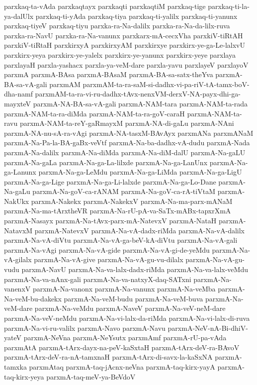 {parxkaq-ta-vAda
parxkaqtayx
parxkaqti
parxkaqtiM
parxkaq-tige
parxkaq-ti-la-ya-dalUlx
parxkaq-ti-yAda
parxkaq-tiya
parxkaq-ti-yalilx
parxkaq-ti-yanunx
parxkaq-tiyeV
parxkaq-tiyu
parxka-ra-Na-dalilx
parxka-ra-Na-da-lilx-ruva
parxka-ra-NavU
parxka-ra-Na-vanunx
parxkarx-mA-cecxVha
parxkiV-tiRtAH
parxkiV-tiRtaH
parxkirxyA
parxkirxyAM
parxkirxye
parxkirx-ye-ga-Le-lalxvU
parxkirx-yeya
parxkirx-ye-yalelx
parxkirx-ye-yanunx
parxkirx-yeye
parxlaya
parxlayaH
parxla-yashacx
parxla-ya-veM-dare
parxla-yavu
parxlayeV
parxlayoV
parxmA
parxmA-BAsa
parxmA-BAsaM
parxmA-BA-sa-satx-theYva
parxmA-BA-sa-vA-gali
parxmAM
parxmAM-ta-ra-saM-si-dadhx-vi-pa-riV-tA-tamx-boV-dha-namf
parxmAM-ta-ra-vi-ru-dadhx-tAvx-nenxVM-derxV-NA-payx-dhi-ga-mayxteV
parxmA-NA-BA-sa-vA-gali
parxmA-NAM-tara
parxmA-NAM-ta-rada
parxmA-NAM-ta-ra-diMda
parxmA-NAM-ta-ra-goV-caraH
parxmA-NAM-ta-ravu
parxmA-NAM-ta-reY-gaRmayxM
parxmA-NA-di-gaLu
parxmA-NAni
parxmA-NA-nu-sA-ra-vAgi
parxmA-NA-tasxM-BAvAyx
parxmANa
parxmANaM
parxmA-Na-Pa-la-BA-gaBx-veVtf
parxmA-Na-ba-dadhx-vA-dudu
parxmA-Nada
parxmA-Na-dalilx
parxmA-Na-diMda
parxmA-Na-diM-dalU
parxmA-Na-gaLU
parxmA-Na-gaLa
parxmA-Na-ga-La-lilxde
parxmA-Na-ga-LanUnx
parxmA-Na-ga-Lanunx
parxmA-Na-ga-LeMdu
parxmA-Na-ga-LiMda
parxmA-Na-ga-LigU
parxmA-Na-ga-Lige
parxmA-Na-ga-Li-lalxde
parxmA-Na-ga-Lo-Dane
parxmA-Na-gaLu
parxmA-Na-goV-ca-rANAM
parxmA-Na-goV-ca-rA-tiVtaM
parxmA-NakUkx
parxmA-Nakekx
parxmA-NakekxV
parxmA-Na-ma-parx-mANaM
parxmA-Na-ma-tArxtheVR
parxmA-Na-rU-pA-va-SaTx-mABx-tapxrXmA
parxmA-Nasayx
parxmA-Na-tAvx-parx-mA-NatevxV
parxmA-NataH
parxmA-NatavxM
parxmA-NatevxV
parxmA-Na-vA-dadx-riMda
parxmA-Na-vA-dalilx
parxmA-Na-vA-diVtu
parxmA-Na-vA-ga-beV-kA-diVtu
parxmA-Na-vA-gali
parxmA-Na-vAgi
parxmA-Na-vA-gide
parxmA-Na-vA-gi-de-yeMdu
parxmA-Na-vA-gilalx
parxmA-Na-vA-give
parxmA-Na-vA-gu-vu-dilalx
parxmA-Na-vA-gu-vudu
parxmA-NavU
parxmA-Na-va-lalx-dadx-riMda
parxmA-Na-va-lalx-veMdu
parxmA-Na-va-nAnx-gali
parxmA-Na-va-natxyX-daq-SATxni
parxmA-Na-vanenxV
parxmA-Na-vanonx
parxmA-Na-vanunx
parxmA-Na-veMba
parxmA-Na-veM-bu-dakekx
parxmA-Na-veM-budu
parxmA-Na-veM-buva
parxmA-Na-veM-dare
parxmA-Na-veMdu
parxmA-NaveV
parxmA-Na-veV-neM-dare
parxmA-Na-veV-neMdu
parxmA-Na-vi-lalx-da-riMda
parxmA-Na-vi-lalx-di-ruva
parxmA-Na-vi-ru-valilx
parxmA-Navo
parxmA-Navu
parxmA-NeV-nA-Bi-dhiV-yateV
parxmA-NeVna
parxmA-NeYsutx
parxmAmf
parxmA-rU-pa-vAda
parxmAtA
parxmA-tArx-dayx-na-peV-kaSxtaH
parxmA-tArx-deV-ra-BAvoV
parxmA-tArx-deV-ra-nA-tamxnaH
parxmA-tArx-di-savx-la-kaSxNA
parxmA-tamxka
parxmAtaq
parxmA-taq-jAcnx-neVna
parxmA-taq-kirx-yayA
parxmA-taq-kirx-yeya
parxmA-taq-meV-ya-BeVdoV
}
